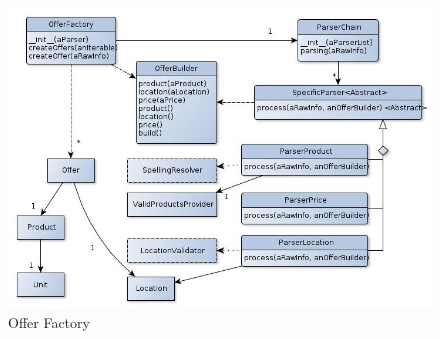 \documentclass[10pt, a4paper]{article}
\begin{document}
\begin{figure}[H]
\centering
\includegraphics[scale=0.65]{graphics/parser_class.jpg}
\caption{Offer Factory}
\end{figure}
\end{document}
